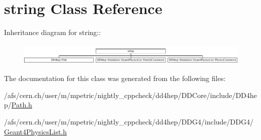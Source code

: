 \hypertarget{classstd_1_1string}{
\section{string Class Reference}
\label{classstd_1_1string}
}
Inheritance diagram for string::\begin{figure}[H]
\begin{center}
\leavevmode
\includegraphics[height=1.05461cm]{classstd_1_1string}
\end{center}
\end{figure}


The documentation for this class was generated from the following files:\begin{DoxyCompactItemize}
\item 
/afs/cern.ch/user/m/mpetric/nightly\_\-cppcheck/dd4hep/DDCore/include/DD4hep/\hyperlink{_path_8h}{Path.h}\item 
/afs/cern.ch/user/m/mpetric/nightly\_\-cppcheck/dd4hep/DDG4/include/DDG4/\hyperlink{_geant4_physics_list_8h}{Geant4PhysicsList.h}\end{DoxyCompactItemize}
